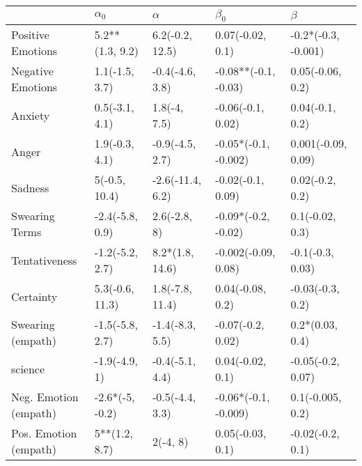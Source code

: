 \begin{tabular}{lllll}
\toprule
{} &       $\alpha_0$ &          $\alpha$ &             $\beta_0$ &              $\beta$ \\
\midrule
Positive Emotions     &  5.2**(1.3, 9.2) &   6.2(-0.2, 12.5) &      0.07(-0.02, 0.1) &  -0.2*(-0.3, -0.001) \\
Negative Emotions     &   1.1(-1.5, 3.7) &   -0.4(-4.6, 3.8) &  -0.08**(-0.1, -0.03) &     0.05(-0.06, 0.2) \\
Anxiety               &   0.5(-3.1, 4.1) &      1.8(-4, 7.5) &     -0.06(-0.1, 0.02) &      0.04(-0.1, 0.2) \\
Anger                 &   1.9(-0.3, 4.1) &   -0.9(-4.5, 2.7) &  -0.05*(-0.1, -0.002) &   0.001(-0.09, 0.09) \\
Sadness               &    5(-0.5, 10.4) &  -2.6(-11.4, 6.2) &     -0.02(-0.1, 0.09) &      0.02(-0.2, 0.2) \\
Swearing Terms        &  -2.4(-5.8, 0.9) &      2.6(-2.8, 8) &   -0.09*(-0.2, -0.02) &      0.1(-0.02, 0.3) \\
Tentativeness         &  -1.2(-5.2, 2.7) &   8.2*(1.8, 14.6) &   -0.002(-0.09, 0.08) &     -0.1(-0.3, 0.03) \\
Certainty             &  5.3(-0.6, 11.3) &   1.8(-7.8, 11.4) &      0.04(-0.08, 0.2) &     -0.03(-0.3, 0.2) \\
Swearing (empath)     &  -1.5(-5.8, 2.7) &   -1.4(-8.3, 5.5) &     -0.07(-0.2, 0.02) &      0.2*(0.03, 0.4) \\
science               &    -1.9(-4.9, 1) &   -0.4(-5.1, 4.4) &      0.04(-0.02, 0.1) &    -0.05(-0.2, 0.07) \\
Neg. Emotion (empath) &  -2.6*(-5, -0.2) &   -0.5(-4.4, 3.3) &  -0.06*(-0.1, -0.009) &     0.1(-0.005, 0.2) \\
Pos. Emotion (empath) &    5**(1.2, 8.7) &          2(-4, 8) &      0.05(-0.03, 0.1) &     -0.02(-0.2, 0.1) \\
\bottomrule
\end{tabular}
